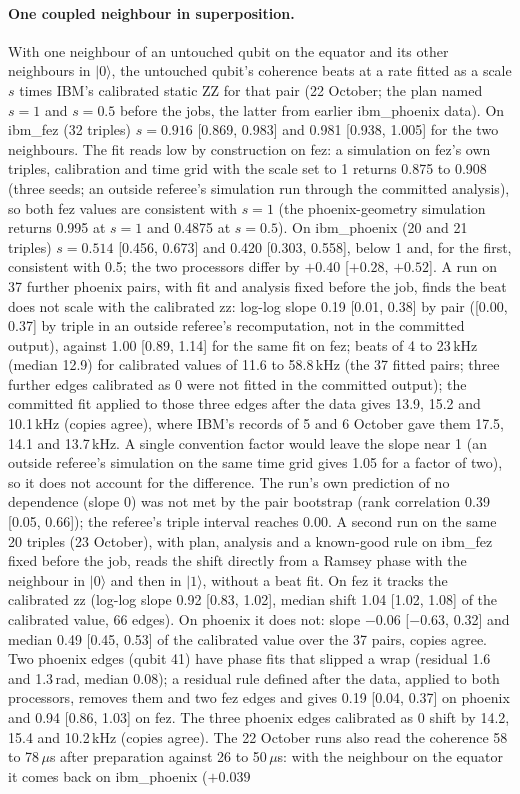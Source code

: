 \documentclass[reprint,amsmath,amssymb,aps,superscriptaddress,nofootinbib]{revtex4-2}
\newcommand{\us}{\,$\mu$s}
\begin{document}
\paragraph*{One coupled neighbour in superposition.} With one neighbour of an untouched qubit on the equator and its other neighbours in $|0\rangle$, the untouched qubit's coherence beats at a rate fitted as a scale $s$ times IBM's calibrated static ZZ for that pair (22 October; the plan named $s=1$ and $s=0.5$ before the jobs, the latter from earlier ibm\_phoenix data). On ibm\_fez (32 triples) $s=0.916$ [0.869, 0.983] and 0.981 [0.938, 1.005] for the two neighbours. The fit reads low by construction on fez: a simulation on fez's own triples, calibration and time grid with the scale set to 1 returns 0.875 to 0.908 (three seeds; an outside referee's simulation run through the committed analysis), so both fez values are consistent with $s=1$ (the phoenix-geometry simulation returns 0.995 at $s=1$ and 0.4875 at $s=0.5$). On ibm\_phoenix (20 and 21 triples) $s=0.514$ [0.456, 0.673] and 0.420 [0.303, 0.558], below 1 and, for the first, consistent with 0.5; the two processors differ by $+0.40$ [$+0.28$, $+0.52$]. A run on 37 further phoenix pairs, with fit and analysis fixed before the job, finds the beat does not scale with the calibrated zz: log-log slope 0.19 [0.01, 0.38] by pair ([0.00, 0.37] by triple in an outside referee's recomputation, not in the committed output), against 1.00 [0.89, 1.14] for the same fit on fez; beats of 4 to 23\,kHz (median 12.9) for calibrated values of 11.6 to 58.8\,kHz (the 37 fitted pairs; three further edges calibrated as 0 were not fitted in the committed output); the committed fit applied to those three edges after the data gives 13.9, 15.2 and 10.1\,kHz (copies agree), where IBM's records of 5 and 6 October gave them 17.5, 14.1 and 13.7\,kHz. A single convention factor would leave the slope near 1 (an outside referee's simulation on the same time grid gives 1.05 for a factor of two), so it does not account for the difference. The run's own prediction of no dependence (slope 0) was not met by the pair bootstrap (rank correlation 0.39 [0.05, 0.66]); the referee's triple interval reaches 0.00. A second run on the same 20 triples (23 October), with plan, analysis and a known-good rule on ibm\_fez fixed before the job, reads the shift directly from a Ramsey phase with the neighbour in $|0\rangle$ and then in $|1\rangle$, without a beat fit. On fez it tracks the calibrated zz (log-log slope 0.92 [0.83, 1.02], median shift 1.04 [1.02, 1.08] of the calibrated value, 66 edges). On phoenix it does not: slope $-0.06$ [$-0.63$, 0.32] and median 0.49 [0.45, 0.53] of the calibrated value over the 37 pairs, copies agree. Two phoenix edges (qubit 41) have phase fits that slipped a wrap (residual 1.6 and 1.3\,rad, median 0.08); a residual rule defined after the data, applied to both processors, removes them and two fez edges and gives 0.19 [0.04, 0.37] on phoenix and 0.94 [0.86, 1.03] on fez. The three phoenix edges calibrated as 0 shift by 14.2, 15.4 and 10.2\,kHz (copies agree). The 22 October runs also read the coherence 58 to 78\us{} after preparation against 26 to 50\us{}: with the neighbour on the equator it comes back on ibm\_phoenix ($+0.039$ 
\end{document}
